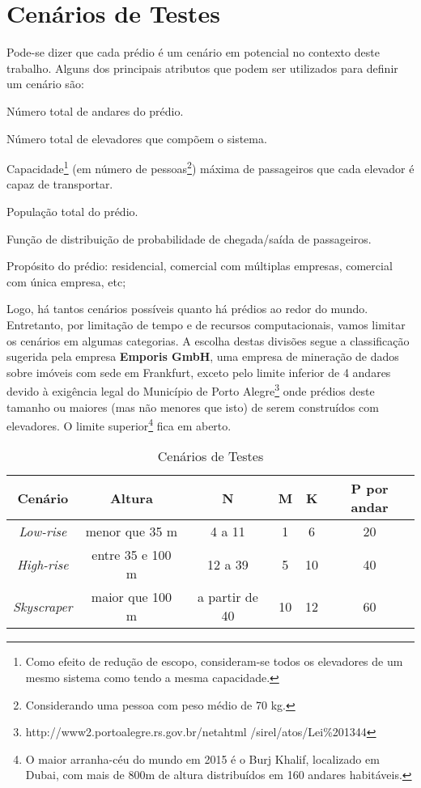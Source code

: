 \section{Cenários de Testes}

Pode-se dizer que cada prédio é um cenário em potencial no contexto deste
trabalho. Alguns dos principais atributos que podem ser utilizados para definir
um cenário são:

\begin{description}[leftmargin=!,labelwidth=\widthof{\bfseries Propósito}]
  \item[N]
  Número total de andares do prédio.
  \item[M]
  Número total de elevadores que compõem o sistema.
  \item[K]
  Capacidade\footnote{Como efeito de redução de escopo, consideram-se todos os
  elevadores de um mesmo sistema como tendo a mesma capacidade.} (em número de
  pessoas\footnote{Considerando uma pessoa com peso médio de 70 kg.}) máxima de
  passageiros que cada elevador é capaz de transportar.
  \item[P]
  População total do prédio.
  \item[F]
  Função de distribuição de probabilidade de chegada/saída de passageiros.
  \item[Propósito]
  Propósito do prédio: residencial, comercial com múltiplas empresas, comercial
  com única empresa, etc;
\end{description}

Logo, há tantos cenários possíveis quanto há prédios ao redor do mundo.
Entretanto, por limitação de tempo e de recursos computacionais, vamos limitar
os cenários em algumas categorias. A escolha destas divisões segue a
classificação\cite{Emporis15} sugerida pela empresa \textbf{Emporis GmbH}, uma empresa de
mineração de dados sobre imóveis com sede em Frankfurt, exceto pelo limite
inferior de 4 andares devido à exigência legal do Município de Porto
Alegre\footnote{http://www2.portoalegre.rs.gov.br/netahtml
/sirel/atos/Lei\%201344} onde prédios deste tamanho ou maiores (mas não menores
que isto) de serem construídos com elevadores. O limite superior\footnote{O
maior arranha-céu do mundo em 2015 é o Burj Khalif, localizado em Dubai, com
mais de 800m de altura distribuídos em 160 andares habitáveis.} fica em aberto.

\begin{table}[htb!]
\centering
\caption{Cenários de Testes}
\label{tab:cenarios}
\begin{tabular}{|c|c|c|c|c|c|}
\hline
{\bf Cenário} & {\bf Altura} & {\bf N}  & {\bf M} & {\bf K} & {\bf P por andar}
\\ \hline
{\it Low-rise}   & menor que 35 m    & 4 a 11         & 1  & 6  & 20 \\ \hline
{\it High-rise}  & entre 35 e 100 m  & 12 a 39        & 5  & 10 & 40 \\ \hline
{\it Skyscraper} & maior que 100 m   & a partir de 40 & 10 & 12 & 60 \\ \hline
\end{tabular}
\end{table}


